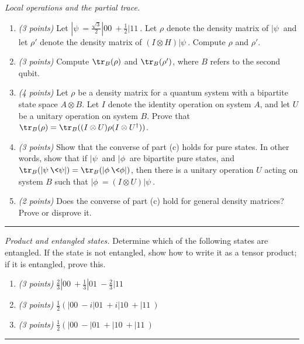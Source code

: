 \documentclass{article}
\newcommand{\shortbar}{\begin{center}\rule{5ex}{0.1pt}\end{center}}
\theoremstyle{plain}
\theoremstyle{definition}
\theoremstyle{remark}
\newenvironment{problem}[1]{\medskip\noindent{\bf Problem #1.~}}{\shortbar}
\newcommand{\points}[1]{\textit{(#1 points)}}
\begin{document}
\begin{problem}{4}
\emph{Local operations and the partial trace.}
\begin{enumerate}
  \item \points{3} Let $|\psi\>=\frac{\sqrt 3}{2} |00\> + \frac{1}{2} |11\>$.  Let $\rho$ denote the density matrix of $|\psi\>$ and let $\rho'$ denote the density matrix of $(I \otimes H)|\psi\>$.  Compute $\rho$ and $\rho'$.
  \item \points{3} Compute $\tr_B(\rho)$ and $\tr_B(\rho')$, where $B$ refers to the second qubit.
  \item \points{4} Let $\rho$ be a density matrix for a quantum system with a bipartite state space $A \otimes B$.  Let $I$ denote the identity operation on system $A$, and let $U$ be a unitary operation on system $B$.  Prove that $\tr_{B}(\rho) = \tr_{B}((I \otimes U)\rho(I \otimes U^\dag))$.
  \item \points{3} Show that the converse of part (c) holds for pure states.  In other words, show that if $|\psi\>$ and $|\phi\>$ are bipartite pure states, and $\tr_{B}(|\psi\>\<\psi|) = \tr_{B}(|\phi\>\<\phi|)$, then there is a unitary operation $U$ acting on system $B$ such that $|\phi\> = (I \otimes U)|\psi\>$.
  \item \points{2} Does the converse of part (c) hold for general density matrices?  Prove or disprove it.
\end{enumerate}
\end{problem}

\begin{problem}{5} \emph{Product and entangled states.}  Determine which of the following states are entangled.  If the state is not entangled, show how to write it as a tensor product; if it is entangled, prove this.
\begin{enumerate}
  \item \points{3} $\frac{2}{3}|00\> + \frac{1}{3}|01\> - \frac{2}{3}|11\>$
  \item \points{3} $\frac{1}{2}(|00\>-i|01\>+i|10\>+|11\>)$
  \item \points{3} $\frac{1}{2}(|00\>-|01\>+|10\>+|11\>)$
\end{enumerate}
\end{problem}
\end{document}
